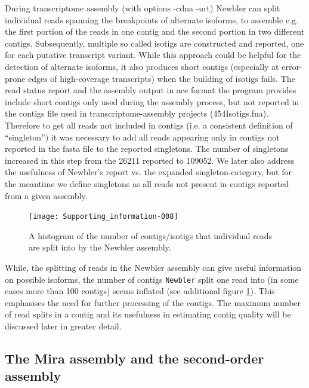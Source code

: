 \documentclass[12pt,a4paper]{article}
\begin{document}
During transcriptome assembly (with options -cdna -urt) Newbler can
split individual reads spanning the breakpoints of alternate isoforms,
to assemble e.g. the first portion of the reads in one contig and the
second portion in two different contigs. Subsequently, multiple so
called isotigs are constructed and reported, one for each putative
transcript variant. While this approach could be helpful for the
detection of alternate isoforms, it also produces short contigs
(especially at error-prone edges of high-coverage transcripts) when
the building of isotigs fails. The read status report and the assembly
output in ace format the program provides include short contigs only
used during the assembly process, but not reported in the contigs file
used in transcriptome-assembly projects (454Isotigs.fna). Therefore to
get all reads not included in contigs (i.e. a consistent definition of
``singleton'') it was necessary to add all reads appearing only in
contigs not reported in the fasta file to the reported singletons. The
number of singletons increased in this step from the
26211 reported to
109052. We later also address the usefulness of
Newbler's report vs. the expanded singleton-category, but for the
meantime we define singletons as all reads not present in contigs
reported from a given assembly.

\newpage
  

\begin{figure}[H]
  \centering
  
\texttt{[image: Supporting\_information-008]}

\caption{A histogram of the number of contigs/isotigs that individual
  reads are split into by the Newbler assembly.}
  \label{fig:newdist}
\end{figure}

While, the splitting of reads in the Newbler assembly can give useful
information on possible isoforms, the number of contigs
\texttt{Newbler} split one read into (in some cases more than 100
contigs) seems inflated (see additional figure \ref{fig:newdist}). This
emphasises the need for further processing of the contigs. The maximum
number of read splits in a contig and its usefulness in estimating
contig quality will be discussed later in greater detail.

\subsection{The Mira assembly and the second-order assembly}
\label{sec:assembly-sec}
\end{document}
